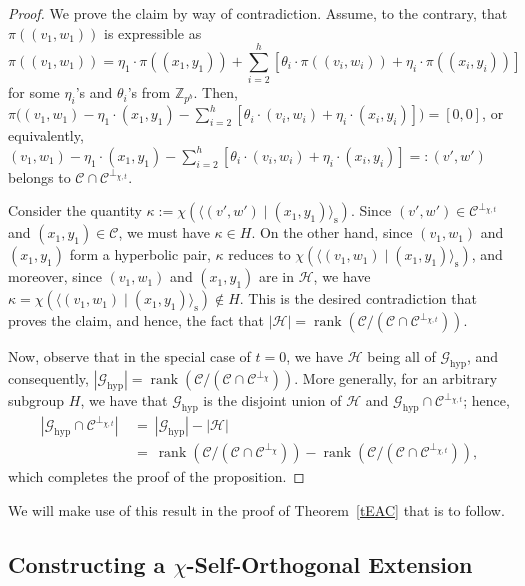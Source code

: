 \documentclass{article}
\DeclareMathOperator{\rank}{rank}
\theoremstyle{remark}
\theoremstyle{definition}
\numberwithin{equation}{section}
\begin{document}
\begin{proof}
We prove the claim by way of contradiction. Assume, to the contrary, that $\pi((v_1,w_1))$ is expressible as 
$$
\pi((v_1,w_1)) = \eta_1 \cdot \pi((x_1,y_1)) + \sum_{i=2}^h [\theta_i \cdot \pi((v_i,w_i)) + \eta_i \cdot \pi((x_i,y_i))]
$$
for some $\eta_i$'s and $\theta_i$'s from $\mathbb{Z}_{p^b}$. Then, $\pi\bigl((v_1,w_1) - \eta_1 \cdot (x_1,y_1) - \sum_{i=2}^h [\theta_i \cdot (v_i,w_i) + \eta_i \cdot (x_i,y_i)]\bigr) = [0,0]$, or equivalently, $(v_1,w_1) - \eta_1 \cdot (x_1,y_1) - \sum_{i=2}^h [\theta_i \cdot (v_i,w_i) + \eta_i \cdot (x_i,y_i)] =: (v',w')$ belongs to $\mathcal{C} \cap \mathcal{C}^{\perp_{\chi,t}}$.

Consider the quantity $\kappa := \chi( \langle (v',w') \mid (x_1,y_1) \rangle_{\text{s}})$. Since $(v',w') \in \mathcal{C}^{\perp_{\chi,t}}$ and $(x_1,y_1) \in \mathcal{C}$, we must have $\kappa \in H$. On the other hand, 
since $(v_1,w_1)$ and $(x_1,y_1)$ form a hyperbolic pair,  $\kappa$ reduces to $\chi( \langle (v_1,w_1) \mid (x_1,y_1) \rangle_{\text{s}})$, and moreover, since $(v_1,w_1)$ and $(x_1,y_1)$ are in $\mathcal{H}$, we have $\kappa = \chi( \langle (v_1,w_1) \mid (x_1,y_1) \rangle_{\text{s}}) \notin H$. This is the desired contradiction that proves the claim, and hence, the fact that $|\mathcal{H}| = \rank(\mathcal{C} / (\mathcal{C} \cap \mathcal{C}^{\perp_{\chi,t}}))$.

Now, observe that in the special case of $t = 0$, we have $\mathcal{H}$ being all of $\mathcal{G}_{\mathrm{hyp}}$, and consequently, $\left|\mathcal{G}_{\mathrm{hyp}}\right| = \rank(\mathcal{C} / (\mathcal{C} \cap \mathcal{C}^{\perp_{\chi}}))$. More generally, for an arbitrary subgroup $H$, we have that $\mathcal{G}_{\mathrm{hyp}}$ is the disjoint union of $\mathcal{H}$ and $\mathcal{G}_{\mathrm{hyp}} \cap \mathcal{C}^{\perp_{\chi,t}}$; hence, 
\begin{align*}
\left|\mathcal{G}_{\mathrm{hyp}} \cap \mathcal{C}^{\perp_{\chi,t}}\right| \ &= \ \left|\mathcal{G}_{\mathrm{hyp}}\right| - |\mathcal{H}| \\
&= \ \rank(\mathcal{C} / (\mathcal{C} \cap \mathcal{C}^{\perp_{\chi}})) - \rank(\mathcal{C} / (\mathcal{C} \cap \mathcal{C}^{\perp_{\chi,t}})),
\end{align*}
which completes the proof of the proposition.
\end{proof}

We will make use of this result in the proof of Theorem~\ref{tEAC} that is to follow.

\subsection{Constructing a $\chi$-Self-Orthogonal Extension} \label{sec:chi-self-ortho}
 
\end{document}
